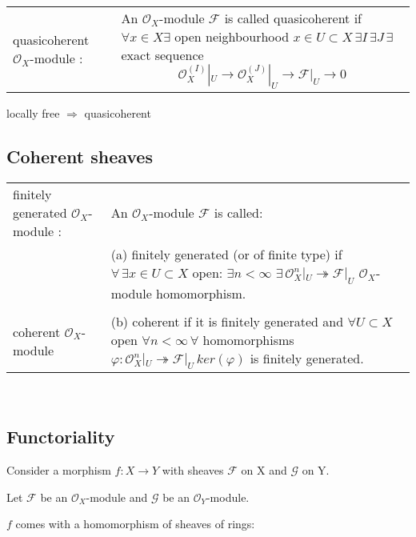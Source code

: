 \documentclass[a4paper, 12pt]{article}
\newcommand{\ca}[1]{\mathcal{#1}}
\newcommand{\caf}{\mathcal{F}}
\newcommand{\cag}{\mathcal{G}}
\newcommand{\oxmod}{$\mathcal{O}_X$-module }
\newcommand{\ox}{\mathcal{O}_X}
\begin{document}
\begin{tabular}{p{4cm} p{12cm}}


quasicoherent \oxmod: & An \oxmod $\caf$ is called quasicoherent if $\forall x\in X \exists$ open neighbourhood $x\in U \subset X\,  \exists I\, \exists J\, \exists $ exact sequence
  \[
\ox^{(I)}|_U \longrightarrow \ox^{(J)}|_U \longrightarrow \caf|_U \longrightarrow 0
\]
\\
\end{tabular}


locally free $\Longrightarrow$ quasicoherent





\subsection{Coherent sheaves}

\begin{tabular}{p{4cm} p{12cm}}



finitely generated \oxmod : & An \oxmod $\caf$ is called: \\
  & (a) finitely generated (or of finite type) if $\forall\,\exists x\in U \subset X $
  open:
  $\exists n < \infty$ $\exists \, \ox^n|_U \twoheadrightarrow \caf|_U$  \oxmod  homomorphism.
\\

&\\

coherent \oxmod &(b) coherent if it is finitely generated and $\forall U \subset X $ open $\forall n < \infty \, \forall$
homomorphisms $\varphi : \ox^n|_U \twoheadrightarrow \caf|_U \, ker(\varphi)$ is
finitely generated. \\
\end{tabular}

\\



  
  



\subsection{Functoriality}

Consider a morphism $f:X\longrightarrow Y$ with sheaves $\caf$ on X and $\cag$ on Y.

Let $\caf$ be an \oxmod and $\cag$ be an $\ca{O}_Y$-module.

$f$ comes with a homomorphism of sheaves of rings:
\end{document}
